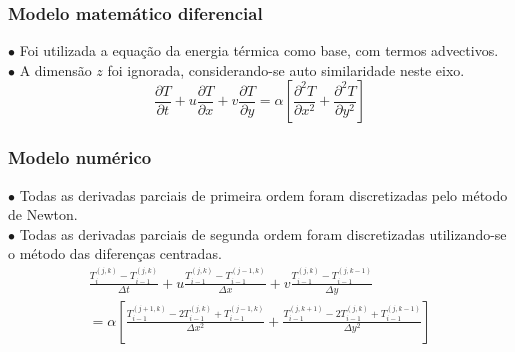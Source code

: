\documentclass[xcolor=dvipsnames,10pt,aspectratio=169]{beamer}
\begin{document}
	
	\begin{frame} 
	\frametitle{Modelo matemático diferencial}
		$\bullet$ Foi utilizada a equação da energia térmica como base, com termos advectivos.\\
		$\bullet$ A dimensão $z$ foi ignorada, considerando-se auto similaridade neste eixo.\\
		
	
	\begin{equation}
	\frac{\partial T}{\partial t} + u \frac{\partial T}{\partial x} + v \frac{\partial T}{\partial y} = \alpha \left[  \frac{\partial^2 T}{\partial x^2} + \frac{\partial^2 T}{\partial y^2}   \right] 
	\end{equation}
	
	\end{frame}






	\begin{frame} 
	\frametitle{Modelo numérico}
	$\bullet$ Todas as derivadas parciais de primeira ordem foram discretizadas pelo método de Newton.\\
	$\bullet$ Todas as derivadas parciais de segunda ordem foram discretizadas utilizando-se o método das diferenças centradas.\\
	
	
	\begin{equation}
	\begin{split}
	\frac{T_i^{(j,k)} - T_{i -1}^{(j,k)} }{\Delta t} + u \frac{T_{i -1}^{(j,k)} - T_{i -1}^{(j - 1,k)}}{\Delta x} + v \frac{T_{i -1}^{(j,k)} - T_{i -1}^{(j,k - 1)}}{\Delta y}  \\ 
	= \alpha \left[  \frac{T_{i -1}^{(j+1,k)} - 2 T_{i -1}^{(j,k)} + T_{i -1}^{(j - 1,k)} }{\Delta x^2} + \frac{T_{i -1}^{(j,k + 1)} - 2 T_{i -1}^{(j,k)} + T_{i -1}^{(j,k - 1)}}{\Delta y^2}   \right] 
	\end{split}
	\end{equation}
	
	\end{frame}
\end{document}
